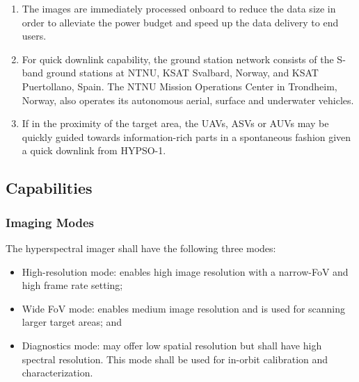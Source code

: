 \begin{enumerate}
    \item The images are immediately processed onboard to reduce the data size in order to alleviate the power budget and speed up the data delivery to end users.
    \item 
    For quick downlink capability, the ground station network consists of the S-band ground stations at NTNU, KSAT Svalbard, Norway, and KSAT Puertollano, Spain. The NTNU Mission Operations Center in Trondheim, Norway, also operates its autonomous aerial, surface and underwater vehicles.
    \item If in the proximity of the target area, the UAVs, ASVs or AUVs may be quickly guided towards information-rich parts in a spontaneous fashion given a quick downlink from HYPSO-1. 
\end{enumerate}
\subsection{Capabilities}
\subsubsection{Imaging Modes}
The hyperspectral imager shall have the following three modes:
\begin{itemize}
    \item High-resolution mode: enables high image resolution with a narrow-FoV and high frame rate setting;
    \item Wide FoV mode: enables medium image resolution and is used for scanning larger target areas; and
    \item Diagnostics mode: may offer low spatial resolution but shall have high spectral resolution. This mode shall be used for in-orbit calibration and characterization.  
\end{itemize}
